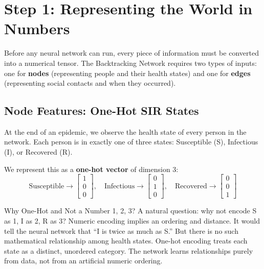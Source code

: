 \section{Step 1: Representing the World in Numbers}

Before any neural network can run, every piece of information must be converted into a numerical tensor. The Backtracking Network requires two types of inputs: one for \textbf{nodes} (representing people and their health states) and one for \textbf{edges} (representing social contacts and when they occurred).

\subsection{Node Features: One-Hot SIR States}

At the end of an epidemic, we observe the health state of every person in the network. Each person is in exactly one of three states: Susceptible (S), Infectious (I), or Recovered (R).

We represent this as a \textbf{one-hot vector} of dimension 3:
\[
\text{Susceptible} \to \begin{bmatrix}1\\0\\0\end{bmatrix}, \quad
\text{Infectious} \to \begin{bmatrix}0\\1\\0\end{bmatrix}, \quad
\text{Recovered} \to \begin{bmatrix}0\\0\\1\end{bmatrix}
\]

\begin{keyinsight}{Why One-Hot and Not a Number 1, 2, 3?}
A natural question: why not encode S as 1, I as 2, R as 3? Numeric encoding implies an ordering and distance. It would tell the neural network that ``I is twice as much as S.'' But there is no such mathematical relationship among health states. One-hot encoding treats each state as a distinct, unordered category. The network learns relationships purely from data, not from an artificial numeric ordering.
\end{keyinsight}

